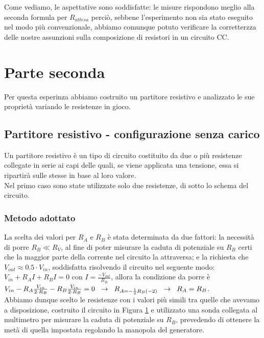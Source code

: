 \documentclass[a4paper]{article}
\theoremstyle{definition}
\begin{document}
\noindent Come vediamo, le aspettative sono soddisfatte: le misure rispondono meglio alla seconda formula per \(R_{attesa}\) perciò, sebbene l'esperimento non sia stato eseguito nel modo più convenzionale, abbiamo comunque potuto verificare la corretterzza delle nostre assunzioni sulla composizione di resistori in un circuito CC.

\section{Parte seconda}
Per questa esperinza abbiamo costruito un partitore resistivo e analizzato le sue proprietà variando le resistenze in gioco. \\

\subsection{Partitore resistivo - configurazione senza carico}
Un partitore resistivo è un tipo di circuito costituito da due o più resistenze collegate in serie ai capi delle quali, se viene applicata una tensione, essa si ripartirà sulle stesse in base al loro valore. \\
Nel primo caso sono state utilizzate solo due resistenze, di sotto lo schema del circuito.

\begin{figure}[!ht]

    \caption{}
  \label{fig:partitore}
\end{figure}


\subsubsection*{Metodo adottato}
La scelta dei valori per \(R_{A}\) e \(R_{B}\) è stata determinata da due fattori: la necessità di porre \(R_{B} \ll R_{V}\), al fine di poter misurare la caduta di potenziale su \(R_{B}\) certi che la maggior parte della corrente nel circuito la attraversa; e la richiesta che \(V_{out} \approx 0.5 \cdot V_{in}\), soddisfatta risolvendo il circuito nel seguente modo: \(V_{in} + R_{A}I + R_{B}I = 0\) con \( I = \frac{-V_{out}}{R_{B}}\), allora la condizione da porre è \(V_{in} - R_{A}\frac{V_{in}}{2 \cdot R_{B}} - R_{B}\frac{V_{in}}{2 \cdot R_{B}} = 0 \hspace{0.2cm} \rightarrow \hspace{0.2cm} R_{A = -\frac{1}{2}R_{B}(-2)} \hspace{0.2cm} \rightarrow \hspace{0.2cm} R_{A} = R_{B}\).\\
Abbiamo dunque scelto le resistenze con i valori più simili tra quelle che avevamo a disposizione, costruito il circuito in Figura \ref{fig:partitore} e utilizzato una sonda collegata al multimetro per misurare la caduta di potenziale su \(R_{B}\), prevedendo di ottenere la metà di quella impostata regolando la manopola del generatore. \\
\end{document}
